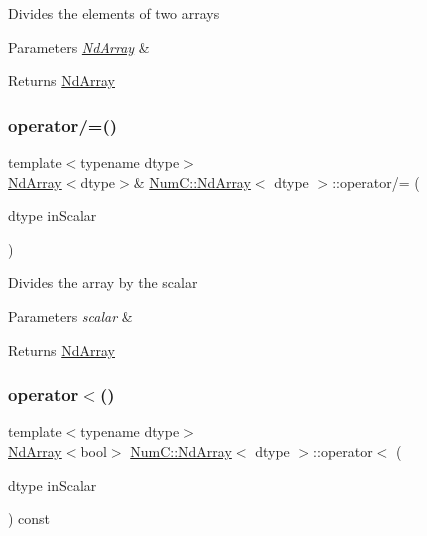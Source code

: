Divides the elements of two arrays


\begin{DoxyParams}{Parameters}
{\em \mbox{\hyperlink{class_num_c_1_1_nd_array}{Nd\+Array}}} & \\
\hline
\end{DoxyParams}
\begin{DoxyReturn}{Returns}
\mbox{\hyperlink{class_num_c_1_1_nd_array}{Nd\+Array}} 
\end{DoxyReturn}
\mbox{\label{class_num_c_1_1_nd_array_a367f7ca671c2c35bda980bb7fff8adf2}} 
\subsubsection{\texorpdfstring{operator/=()}{operator/=()}\hspace{0.1cm}{\footnotesize\ttfamily [2/2]}}
{\footnotesize\ttfamily template$<$typename dtype$>$ \\
\mbox{\hyperlink{class_num_c_1_1_nd_array}{Nd\+Array}}$<$dtype$>$\& \mbox{\hyperlink{class_num_c_1_1_nd_array}{Num\+C\+::\+Nd\+Array}}$<$ dtype $>$\+::operator/= (\begin{DoxyParamCaption}\item[{dtype}]{in\+Scalar }\end{DoxyParamCaption})\hspace{0.3cm}{\ttfamily [inline]}}

Divides the array by the scalar


\begin{DoxyParams}{Parameters}
{\em scalar} & \\
\hline
\end{DoxyParams}
\begin{DoxyReturn}{Returns}
\mbox{\hyperlink{class_num_c_1_1_nd_array}{Nd\+Array}} 
\end{DoxyReturn}
\mbox{\label{class_num_c_1_1_nd_array_ae6e2f419585540a0198dd500f2c6a547}} 
\subsubsection{\texorpdfstring{operator$<$()}{operator<()}\hspace{0.1cm}{\footnotesize\ttfamily [1/2]}}
{\footnotesize\ttfamily template$<$typename dtype$>$ \\
\mbox{\hyperlink{class_num_c_1_1_nd_array}{Nd\+Array}}$<$bool$>$ \mbox{\hyperlink{class_num_c_1_1_nd_array}{Num\+C\+::\+Nd\+Array}}$<$ dtype $>$\+::operator$<$ (\begin{DoxyParamCaption}\item[{dtype}]{in\+Scalar }\end{DoxyParamCaption}) const\hspace{0.3cm}{\ttfamily [inline]}}

